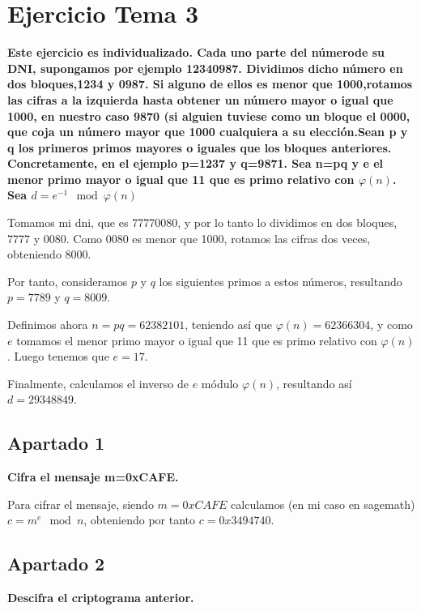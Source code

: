 \documentclass[a4paper]{article}
\title {\fbox{\Huge{\textbf{Ejercicio Tema 3}}}}
\author {\fbox{Ana Buendía Ruiz-Azuaga}}
\begin{document}
\maketitle


\section{Ejercicio Tema 3}

\textbf{Este ejercicio es individualizado. Cada uno parte del númerode su DNI, supongamos por ejemplo 12340987. Dividimos dicho número en dos bloques,1234 y 0987. Si alguno de ellos es menor que 1000,rotamos las cifras a la izquierda hasta obtener un número mayor o igual que 1000, en nuestro caso 9870 (si alguien tuviese como un bloque el 0000, que coja un número mayor que 1000 cualquiera a su elección.Sean p y q los primeros primos mayores o iguales que los bloques anteriores.  Concretamente,  en  el  ejemplo p=1237 y q=9871.  Sea n=pq y e el menor primo mayor o igual que 11 que es primo relativo con $\varphi(n)$. Sea $d=e^{-1}\mod \varphi(n)$}

Tomamos mi dni, que es 77770080, y por lo tanto lo dividimos en dos bloques, 7777 y 0080. Como 0080 es menor que 1000, rotamos las cifras dos veces, obteniendo 8000.

Por tanto, consideramos $p$ y $q$ los siguientes primos a estos números, resultando $p=7789$ y $q=8009$.

Definimos ahora $n=pq=62382101$, teniendo así que $\varphi(n)=62366304$, y como $e$ tomamos el menor primo mayor o igual que 11 que es primo relativo con $\varphi(n)$. Luego tenemos que $e=17$.

Finalmente, calculamos el inverso de $e$ módulo $\varphi(n)$, resultando así $d=29348849$.

\subsection{Apartado 1}

\textbf{Cifra el mensaje m=0xCAFE.}

Para cifrar el mensaje, siendo $m=0xCAFE$ calculamos (en mi caso en sagemath) $c=m^e \mod n$, obteniendo por tanto $c=0x3494740$.

\subsection{Apartado 2}
\textbf{Descifra el criptograma anterior.}
\end{document}
